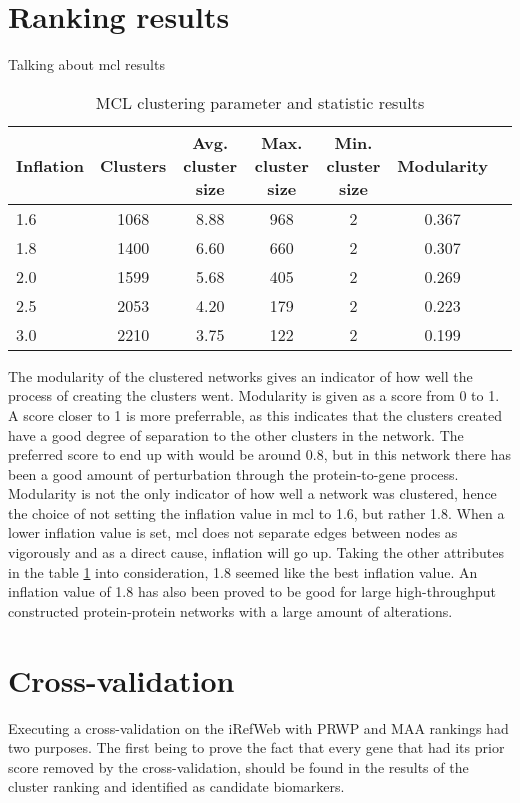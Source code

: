 \section{Ranking results}
Talking about \gls{mcl} results
\begin{table}[H]
    \centering
    \begin{tabular}{| l | c | c | c | c | c | c |}
        \hline
        \textbf{Inflation} & \textbf{Clusters} & \textbf{Avg.  cluster size} &
        \textbf{Max. cluster size} & \textbf{Min. cluster size} &
        \textbf{Modularity} \\
        \hline
        1.6 & 1068 & 8.88 & 968 & 2 & 0.367 \\
        1.8 & 1400 & 6.60 & 660 & 2 & 0.307 \\
        2.0 & 1599 & 5.68 & 405 & 2 & 0.269 \\
        2.5 & 2053 & 4.20 & 179 & 2 & 0.223 \\
        3.0 & 2210 & 3.75 & 122 & 2 & 0.199 \\
        \hline
    \end{tabular}
    \caption{MCL clustering parameter and statistic results}
    \label{tab:mcl-inflation}
\end{table}
The modularity of the clustered networks gives an indicator of how well the
process of creating the clusters went. Modularity is given as a score from 0 to
1. A score closer to 1 is more preferrable, as this indicates that the clusters
created have a good degree of separation to the other clusters in the network.
The preferred score to end up with would be around 0.8, but in this network
there has been a good amount of perturbation through the protein-to-gene
process. Modularity is not the only indicator of how well a network was
clustered, hence the choice of not setting the inflation value in \gls{mcl} to
1.6, but rather 1.8. When a lower inflation value is set, \gls{mcl} does not
separate edges between nodes as vigorously and as a direct cause, inflation will
go up. Taking the other attributes in the table \ref{tab:mcl-inflation} into
consideration, 1.8 seemed like the best inflation value. An inflation value of
1.8 has also been proved to be good for large high-throughput constructed
protein-protein networks with a large amount of alterations\cite{mcl-inflation}.

\section{Cross-validation}
Executing a cross-validation on the iRefWeb with PRWP and MAA rankings had two
purposes. The first being to prove the fact that every gene that had its prior
score removed by the cross-validation, should be found in the results of the
cluster ranking and identified as candidate biomarkers. 

